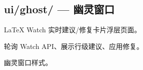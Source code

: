 \subsection{ui/ghost/ — 幽灵窗口}

\begin{description}[leftmargin=4em,style=nextline]
    \item[\texttt{index.html}]
    LaTeX Watch 实时建议/修复卡片浮层页面。

    \item[\texttt{ghost.js}]
    轮询 Watch API、展示行级建议、应用修复。

    \item[\texttt{ghost.css}]
    幽灵窗口样式。
\end{description}
